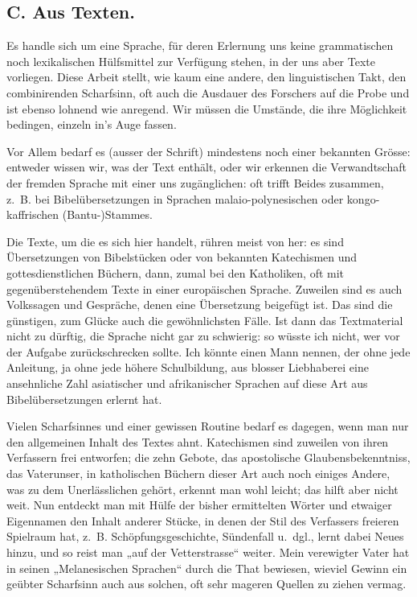 \subsection*{C. Aus Texten.}

Es handle sich um eine Sprache, für deren Erlernung uns keine grammatischen noch lexikalischen Hülfsmittel zur Verfügung stehen, in der uns aber Texte vorliegen.  Diese Arbeit stellt, wie kaum eine andere, den linguistischen Takt, den combinirenden Scharfsinn, oft auch die Ausdauer des Forschers auf die Probe und ist ebenso lohnend wie anregend. Wir müssen die Umstände, die ihre Möglichkeit bedingen, einzeln in’s Auge fassen.

Vor Allem bedarf es (ausser der Schrift) mindestens noch einer bekannten Grösse: entweder wissen wir, was der Text enthält, oder wir erkennen die Verwandtschaft der fremden Sprache mit einer uns zugänglichen: oft trifft Beides zusammen, z.~B. bei Bibelübersetzungen in Sprachen malaio-polynesischen oder kongo-kaffrischen (Bantu-)Stammes.

Die Texte, um die es sich hier handelt, rühren meist von  her: es sind Übersetzungen von Bibelstücken oder von bekannten Katechismen und gottesdienstlichen Büchern, dann, zumal bei den Katholiken, oft mit gegenüberstehendem Texte in einer europäischen Sprache. Zuweilen sind es auch Volkssagen und Gespräche, denen eine Übersetzung beigefügt ist. Das sind die günstigen, zum Glücke auch die gewöhnlichsten Fälle. Ist dann das Textmaterial nicht \label{sp.74} zu dürftig, die Sprache nicht gar zu schwierig: so wüsste ich nicht, wer vor der Aufgabe zurückschrecken sollte. Ich könnte einen Mann nennen, der ohne jede Anleitung, ja ohne jede höhere Schulbildung, aus blosser Liebhaberei eine ansehnliche Zahl asiatischer und afrikanischer Sprachen auf diese Art aus Bibelübersetzungen erlernt hat.

\label{fp.76}

Vielen Scharfsinnes und einer gewissen Routine bedarf es dagegen, wenn man nur den allgemeinen Inhalt des Textes ahnt. Katechismen sind zuweilen von ihren Verfassern frei entworfen; die zehn Gebote, das apostolische Glaubensbekenntniss, das Vaterunser, in katholischen Büchern dieser Art auch noch einiges Andere, was zu dem Unerlässlichen gehört, erkennt man wohl leicht; das hilft aber nicht weit. Nun entdeckt man mit Hülfe der bisher ermittelten Wörter und etwaiger Eigennamen den Inhalt anderer Stücke, in denen der Stil des Verfassers freieren Spielraum hat, z.~B. Schöpfungsgeschichte, Sündenfall u.~dgl., lernt dabei Neues hinzu, und so reist man „auf der Vetterstrasse“ weiter. Mein verewigter Vater hat in seinen „Melanesischen Sprachen“ durch die That bewiesen, wieviel Gewinn ein geübter Scharfsinn auch aus solchen, oft sehr mageren Quellen zu ziehen vermag.

